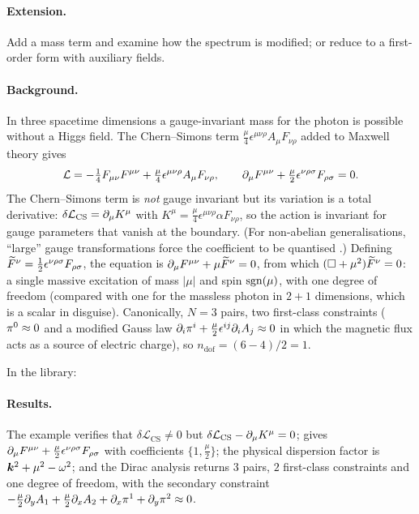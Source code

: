 \paragraph{Extension.} Add a mass term and examine how the spectrum is modified; or reduce to a first-order form with auxiliary fields.


\paragraph{Background.} In three spacetime dimensions a gauge-invariant mass for the photon is possible without a Higgs field. The Chern--Simons term $\tfrac\mu4\epsilon^{\mu\nu\rho}A_\mu F_{\nu\rho}$ added to Maxwell theory \cite{DeserJackiwTempleton1982a,DeserJackiwTempleton1982b} gives
\begin{equation}
\mathcal L=-\tfrac14F_{\mu\nu}F^{\mu\nu}+\tfrac\mu4\epsilon^{\mu\nu\rho}A_\mu F_{\nu\rho},\qquad
\partial_\mu F^{\mu\nu}+\tfrac\mu2\epsilon^{\nu\rho\sigma}F_{\rho\sigma}=0.
\end{equation}
The Chern--Simons term is \emph{not} gauge invariant but its variation is a total derivative: $\delta\mathcal L_{\mathrm{CS}}=\partial_\mu K^\mu$ with $K^\mu=\tfrac\mu4\epsilon^{\mu\nu\rho}\alpha F_{\nu\rho}$, so the action is invariant for gauge parameters that vanish at the boundary. (For non-abelian generalisations, ``large'' gauge transformations force the coefficient to be quantised \cite{DeserJackiwTempleton1982a}.) Defining $\widetilde{F}^\nu=\tfrac12\epsilon^{\nu\rho\sigma}F_{\rho\sigma}$, the equation is $\partial_\mu F^{\mu\nu}+\mu\widetilde{F}^\nu=0$, from which $(\square+\mu^2)\widetilde{F}^\nu=0$: a single massive excitation of mass $|\mu|$ and spin $\operatorname{sgn}(\mu)$, with one degree of freedom (compared with one for the massless photon in $2{+}1$ dimensions, which is a scalar in disguise). Canonically, $N=3$ pairs, two first-class constraints ($\pi^0\approx0$ and a modified Gauss law $\partial_i\pi^i+\tfrac\mu2\epsilon^{ij}\partial_iA_j\approx0$ in which the magnetic flux acts as a source of electric charge), so $n_{\mathrm{dof}}=(6-4)/2=1$.

In the library:


\paragraph{Results.} The example verifies that $\delta\mathcal L_{\mathrm{CS}}\neq0$ but $\delta\mathcal L_{\mathrm{CS}}-\partial_\mu K^\mu=0$;  gives $\partial_\mu F^{\mu\nu}+\tfrac\mu2\epsilon^{\nu\rho\sigma}F_{\rho\sigma}$ with coefficients $\{1,\tfrac\mu2\}$; the physical dispersion factor is $\bm{k}^2+\mu^2-\omega^2$; and the Dirac analysis returns $3$ pairs, $2$ first-class constraints and one degree of freedom, with the secondary constraint $-\tfrac\mu2\partial_yA_1+\tfrac\mu2\partial_xA_2+\partial_x\pi^1+\partial_y\pi^2\approx0$.

